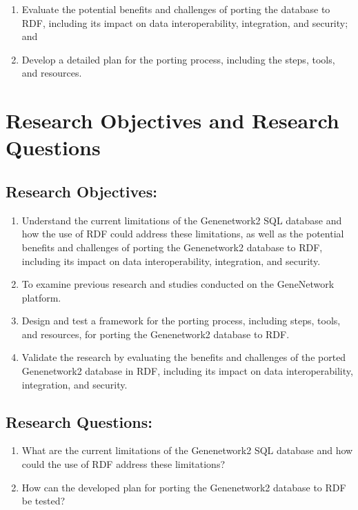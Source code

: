 \begin{enumerate}
\item Evaluate the potential benefits and challenges of porting the database to RDF, including its impact on data interoperability, integration, and security; and
\item Develop a detailed plan for the porting process, including the steps, tools, and resources.
\end{enumerate}


\section{Research Objectives and Research Questions}

\subsection*{Research Objectives:}

\begin{enumerate}
\item Understand the current limitations of the Genenetwork2 SQL database and how the use of RDF could address these limitations, as well as the potential benefits and challenges of porting the Genenetwork2 database to RDF, including its impact on data interoperability, integration, and security.
  \item To examine previous research and studies conducted on the GeneNetwork platform.
\item Design and test a framework for the porting process, including steps, tools, and resources, for porting the Genenetwork2 database to RDF.
\item Validate the research by evaluating the benefits and challenges of the ported Genenetwork2 database in RDF, including its impact on data interoperability, integration, and security.
\end{enumerate}

\subsection*{Research Questions:}

\begin{enumerate}
\item What are the current limitations of the Genenetwork2 SQL database and how could the use of RDF address these limitations?
\item How can the developed plan for porting the Genenetwork2 database to RDF be tested?
\end{enumerate}
   

